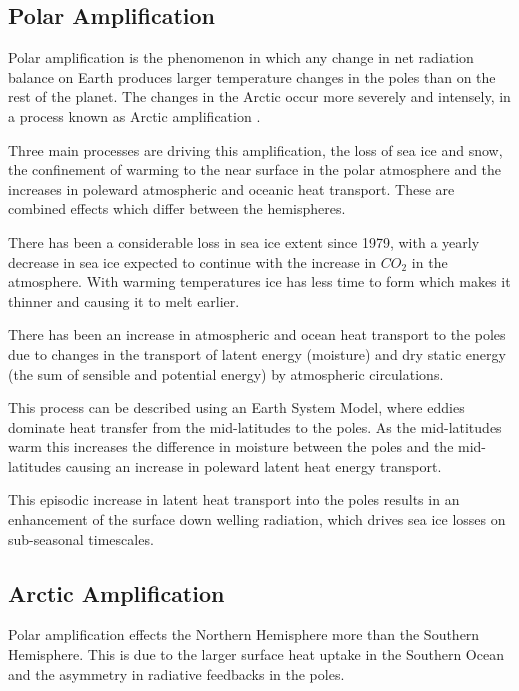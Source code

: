 \documentclass[11pt, oneside]{article}
\begin{document}
\subsection{Polar Amplification}\label{polar_amplification}
Polar amplification is the phenomenon in which any change in net radiation balance on Earth produces larger temperature changes in the poles than on the rest of the planet. The changes in the Arctic occur more severely and intensely, in a process known as Arctic amplification \cite{england2021recent}.

{\color{blue}{How this effects - seasons- sea ice changes }}

Three main processes are driving this amplification, the loss of sea ice and snow, the confinement of warming to the near surface in the polar atmosphere and the increases in poleward atmospheric and oceanic heat transport.   These are combined effects which differ between the hemispheres.

There has been a considerable loss in sea ice extent since 1979, with a yearly decrease in sea ice expected to continue with the increase in $CO_2$ in the atmosphere. With warming temperatures ice has less time to form which makes it thinner and causing it to melt earlier. 

There has been an increase in atmospheric and ocean heat transport to the poles due to changes in the transport of latent energy (moisture) and dry static energy (the sum of sensible and potential energy) by atmospheric circulations. 

This process can be described using an Earth System Model, where eddies dominate heat transfer from the mid-latitudes to the poles. As the mid-latitudes warm this increases the difference in moisture between the poles and the mid-latitudes causing an increase in poleward latent heat energy transport. 

This episodic increase in latent heat transport into the poles results in an enhancement of the surface down welling radiation, which drives sea ice losses on sub-seasonal timescales. 


\subsection{Arctic Amplification}
Polar amplification effects the Northern Hemisphere more than the Southern Hemisphere. This is due to the larger surface heat uptake in the Southern Ocean and the asymmetry in radiative feedbacks in the poles. 
\end{document}
